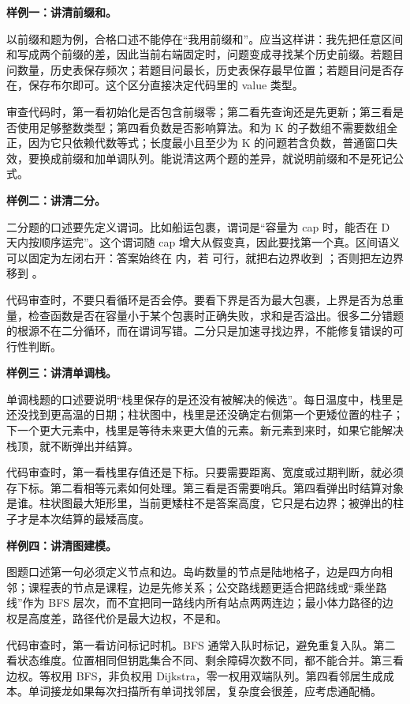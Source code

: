 \noindent\textbf{样例一：讲清前缀和。}

以前缀和题为例，合格口述不能停在“我用前缀和”。应当这样讲：我先把任意区间和写成两个前缀的差，因此当前右端固定时，问题变成寻找某个历史前缀。若题目问数量，历史表保存频次；若题目问最长，历史表保存最早位置；若题目问是否存在，保存布尔即可。这个区分直接决定代码里的 value 类型。

审查代码时，第一看初始化是否包含前缀零；第二看先查询还是先更新；第三看是否使用足够整数类型；第四看负数是否影响算法。和为 K 的子数组不需要数组全正，因为它只依赖代数等式；长度最小且至少为 K 的问题若含负数，普通窗口失效，要换成前缀和加单调队列。能说清这两个题的差异，就说明前缀和不是死记公式。

\noindent\textbf{样例二：讲清二分。}

二分题的口述要先定义谓词。比如船运包裹，谓词是“容量为 cap 时，能否在 D 天内按顺序运完”。这个谓词随 cap 增大从假变真，因此要找第一个真。区间语义可以固定为左闭右开：答案始终在 \code{[left,right)} 内，若  可行，就把右边界收到 ；否则把左边界移到 。

代码审查时，不要只看循环是否会停。要看下界是否为最大包裹，上界是否为总重量，检查函数是否在容量小于某个包裹时正确失败，求和是否溢出。很多二分错题的根源不在二分循环，而在谓词写错。二分只是加速寻找边界，不能修复错误的可行性判断。

\noindent\textbf{样例三：讲清单调栈。}

单调栈题的口述要说明“栈里保存的是还没有被解决的候选”。每日温度中，栈里是还没找到更高温的日期；柱状图中，栈里是还没确定右侧第一个更矮位置的柱子；下一个更大元素中，栈里是等待未来更大值的元素。新元素到来时，如果它能解决栈顶，就不断弹出并结算。

代码审查时，第一看栈里存值还是下标。只要需要距离、宽度或过期判断，就必须存下标。第二看相等元素如何处理。第三看是否需要哨兵。第四看弹出时结算对象是谁。柱状图最大矩形里，当前更矮柱不是答案高度，它只是右边界；被弹出的柱子才是本次结算的最矮高度。

\noindent\textbf{样例四：讲清图建模。}

图题口述第一句必须定义节点和边。岛屿数量的节点是陆地格子，边是四方向相邻；课程表的节点是课程，边是先修关系；公交路线题更适合把路线或“乘坐路线”作为 BFS 层次，而不宜把同一路线内所有站点两两连边；最小体力路径的边权是高度差，路径代价是最大边权，不是和。

代码审查时，第一看访问标记时机。BFS 通常入队时标记，避免重复入队。第二看状态维度。位置相同但钥匙集合不同、剩余障碍次数不同，都不能合并。第三看边权。等权用 BFS，非负权用 Dijkstra，零一权用双端队列。第四看邻居生成成本。单词接龙如果每次扫描所有单词找邻居，复杂度会很差，应考虑通配桶。

